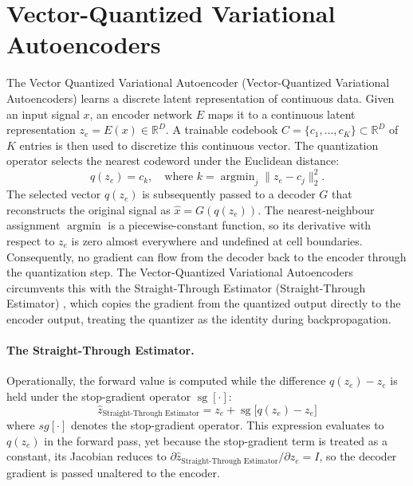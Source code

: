 \documentclass[12pt]{report}
\begin{document}
\section{Vector-Quantized Variational Autoencoders}
\label{sec:bg_vq}
The Vector Quantized Variational Autoencoder (Vector-Quantized Variational Autoencoders) \cite{vqvae} learns a discrete latent representation of continuous data. Given an input signal $x$, an encoder network $E$ maps it to a continuous latent representation $z_e = E(x) \in \mathbb{R}^D$. A trainable codebook $C = \{c_1, \dots, c_K\} \subset \mathbb{R}^D$ of $K$ entries is then used to discretize this continuous vector. The quantization operator selects the nearest codeword under the Euclidean distance:
\begin{equation}
    q(z_e) = c_k, \quad \text{where } k = \operatorname{argmin}_j \| z_e - c_j \|^2_2.
\end{equation}
The selected vector $q(z_e)$ is subsequently passed to a decoder $G$ that reconstructs the original signal as $\hat{x} = G(q(z_e))$. The nearest-neighbour assignment $\operatorname{argmin}$ is a piecewise-constant function, so its derivative with respect to $z_e$ is zero almost everywhere and undefined at cell boundaries. Consequently, no gradient can flow from the decoder back to the encoder through the quantization step. The Vector-Quantized Variational Autoencoders circumvents this with the Straight-Through Estimator (Straight-Through Estimator) \cite{straight_through_estimator}, which copies the gradient from the quantized output directly to the encoder output, treating the quantizer as the identity during backpropagation.

\paragraph{The Straight-Through Estimator.}
 Operationally, the forward value is computed while the difference $q(z_e) - z_e$ is held under the stop-gradient operator $\operatorname{sg}[\cdot]$:
\begin{equation}
    \label{eq:bg_ste}
    \hat{z}_{\text{Straight-Through Estimator}} = z_e + \operatorname{sg}\big[q(z_e) - z_e\big]
\end{equation}
where $sg[\cdot]$ denotes the stop-gradient operator. This expression evaluates to $q(z_e)$ in the forward pass, yet because the stop-gradient term is treated as a constant, its Jacobian reduces to $\partial \hat{z}_{\text{Straight-Through Estimator}} / \partial z_e = I$, so the decoder gradient is passed unaltered to the encoder.
\end{document}
